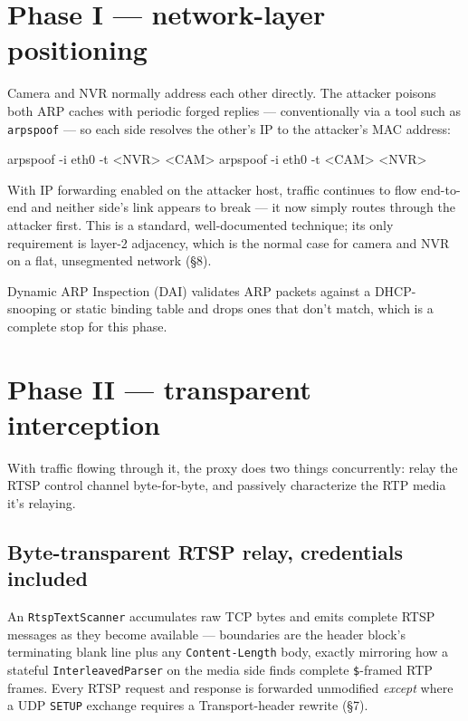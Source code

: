 \documentclass[11pt,a4paper]{article}
\newcommand{\code}[1]{\texttt{\small #1}}
\begin{document}
\section{Phase I --- network-layer positioning}
Camera and NVR normally address each other directly. The attacker poisons both ARP caches with periodic forged replies --- conventionally via a tool such as \code{arpspoof} --- so each side resolves the other's IP to the attacker's MAC address:

\begin{consolebox}
\begin{consolev}
arpspoof -i eth0 -t <NVR> <CAM>
arpspoof -i eth0 -t <CAM> <NVR>
\end{consolev}
\end{consolebox}

With IP forwarding enabled on the attacker host, traffic continues to flow end-to-end and neither side's link appears to break --- it now simply routes through the attacker first. This is a standard, well-documented technique; its only requirement is layer-2 adjacency, which is the normal case for camera and NVR on a flat, unsegmented network (\S8).

\begin{cautionbox}
Dynamic ARP Inspection (DAI) validates ARP packets against a DHCP-snooping or static binding table and drops ones that don't match, which is a complete stop for this phase.
\end{cautionbox}

\section{Phase II --- transparent interception}
With traffic flowing through it, the proxy does two things concurrently: relay the RTSP control channel byte-for-byte, and passively characterize the RTP media it's relaying.

\subsection{Byte-transparent RTSP relay, credentials included}
An \code{RtspTextScanner} accumulates raw TCP bytes and emits complete RTSP messages as they become available --- boundaries are the header block's terminating blank line plus any \code{Content-Length} body, exactly mirroring how a stateful \code{InterleavedParser} on the media side finds complete \code{\$}-framed RTP frames. Every RTSP request and response is forwarded unmodified \emph{except} where a UDP \code{SETUP} exchange requires a Transport-header rewrite (\S7).
\end{document}
